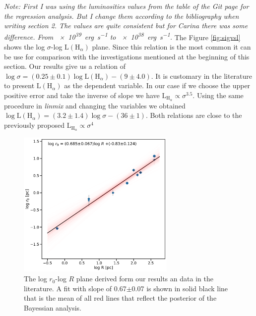 \documentclass[fleqn,usenatbib, useAMS, a4paper]{mnras}
\begin{document}
\textit{Note: First I was using the luminosities values from the table of the Git page for the regression analysis. But I change them according to the bibliography when writing section 2. The values are quite consistent but for Carina there was some difference. From \SI{e39}{erg.s^{-1}} to \SI{e38}{erg.s^{-1}}.}
The Figure \ref{fig:sigvsl} shows the log $\sigma$-log $\text{L}(\text{H}_{\alpha})$ plane.
Since this relation is the most common it can be use for comparison with the investigations mentioned at the beginning of this section.
Our results give us a relation of $\log \sigma = (0.25 \pm 0.1) \log \text{L}(\text{H}_{\alpha})-(9 \pm 4.0)$.
It is customary in the literature to present $\text{L} (\text{H}_{\alpha})$ as the dependent variable.
In our case if we choose the upper positive error and take the inverse of slope we have \(\text{L}_{\text{H}_{\alpha}} \propto \sigma^{3.5}\). 
Using the same procedure in \textit{linmix} and changing the variables we obtained $\log \text{L}(\text{H}_{\alpha}) = (3.2\pm 1.4) \log \sigma -(36 \pm 1)$.
Both relations are close to the previously proposed \(\text{L}_{\text{H}_{\alpha}} \propto \sigma^{4}\)




\begin{figure}
\centering 
\includegraphics[width=3in]{Figures/rvsR}
\caption{The log $r_0$-log $R$ plane derived form our results an data in the literature. A fit with slope of 0.67$\pm$0.07 is shown in solid black line that is the mean of all red lines that reflect the posterior of the Bayessian analysis. }
\label{fig:rvsR}
\end{figure}
\end{document}
